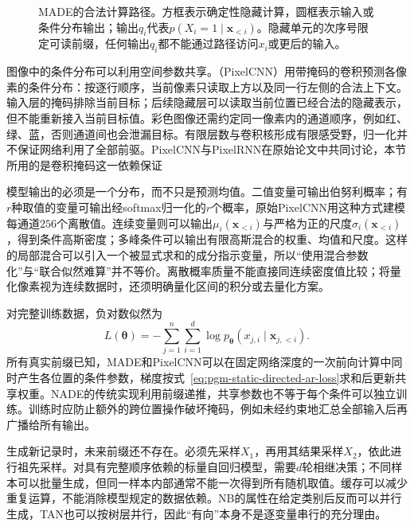 \begin{figure}[htbp]
  \centering
  
  \caption{MADE的合法计算路径。方框表示确定性隐藏计算，圆框表示输入或条件分布输出；输出$q_i$代表$p(X_i=1\mid\bm{x}_{<i})$。隐藏单元的次序号限定可读前缀，任何输出$q_i$都不能通过路径访问$x_i$或更后的输入。}
  \label{fig:pgm-static-directed-mask}
\end{figure}

图像中的条件分布可以利用空间参数共享。（PixelCNN）用带掩码的卷积预测各像素的条件分布：按逐行顺序，当前像素只读取上方以及同一行左侧的合法上下文。输入层的掩码排除当前目标；后续隐藏层可以读取当前位置已经合法的隐藏表示，但不能重新接入当前目标值。彩色图像还需约定同一像素内的通道顺序，例如红、绿、蓝，否则通道间也会泄漏目标。有限层数与卷积核形成有限感受野，归一化并不保证网络利用了全部前驱。PixelCNN与PixelRNN在原始论文中共同讨论，本节所用的是卷积掩码这一依赖保证

模型输出的必须是一个分布，而不只是预测均值。二值变量可输出伯努利概率；有$r$种取值的变量可输出经softmax归一化的$r$个概率，原始PixelCNN用这种方式建模每通道$256$个离散值。连续变量则可以输出$\mu_i(\bm{x}_{<i})$与严格为正的尺度$\sigma_i(\bm{x}_{<i})$，得到条件高斯密度；多峰条件可以输出有限高斯混合的权重、均值和尺度。这样的局部混合可以引入一个被显式求和的成分指示变量，所以“使用混合参数化”与“联合似然难算”并不等价。离散概率质量不能直接同连续密度值比较；将量化像素视为连续数据时，还须明确量化区间的积分或去量化方案。

对完整训练数据，负对数似然为
\begin{equation}
  \label{eq:pgm-static-directed-ar-loss}
  L(\bm{\theta})=-\sum_{j=1}^{n}\sum_{i=1}^{d}
      \log p_{\bm{\theta}}
      (x_{j,i}\mid\bm{x}_{j,<i}).
\end{equation}
所有真实前缀已知，MADE和PixelCNN可以在固定网络深度的一次前向计算中同时产生各位置的条件参数，梯度按式~\eqref{eq:pgm-static-directed-ar-loss}求和后更新共享权重。NADE的传统实现利用前缀递推，共享参数也不等于每个条件可以独立训练。训练时应防止额外的跨位置操作破坏掩码，例如未经约束地汇总全部输入后再广播给所有输出。

生成新记录时，未来前缀还不存在。必须先采样$X_1$，再用其结果采样$X_2$，依此进行祖先采样。对具有完整顺序依赖的标量自回归模型，需要$d$轮相继决策；不同样本可以批量生成，但同一样本内部通常不能一次得到所有随机取值。缓存可以减少重复运算，不能消除模型规定的数据依赖。NB的属性在给定类别后反而可以并行生成，TAN也可以按树层并行，因此“有向”本身不是逐变量串行的充分理由。

